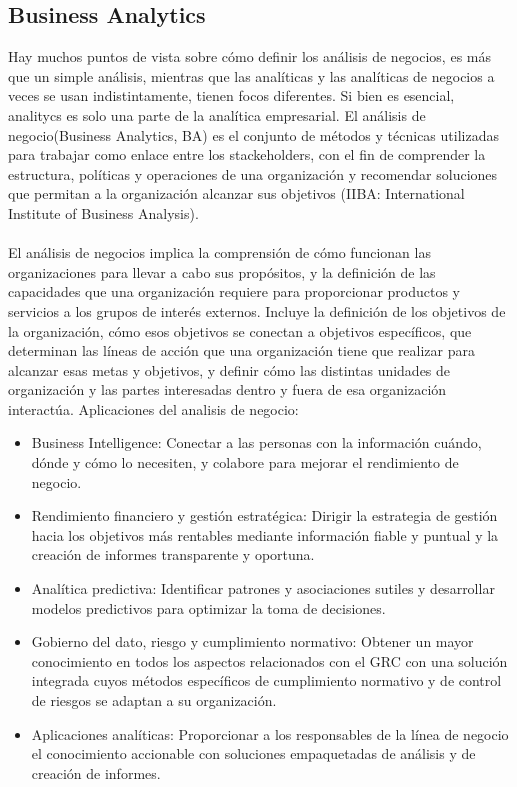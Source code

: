 \documentclass[%
 reprint,
 amsmath,amssymb,
 aps,
]{revtex4-1}
\begin{document}
\subsection{Business Analytics}
Hay muchos puntos de vista sobre cómo definir los análisis de negocios, es más que un simple análisis, mientras que las analíticas y las analíticas de negocios a veces se usan indistintamente, tienen focos diferentes. Si bien es esencial, analitycs es solo una parte de la analítica empresarial.
El análisis de negocio(Business Analytics, BA) es el conjunto de métodos y técnicas utilizadas para trabajar como enlace entre los stackeholders, con el fin de comprender la estructura, políticas y operaciones de una organización y recomendar soluciones que permitan a la organización alcanzar sus objetivos (IIBA: International Institute of Business Analysis).\\\\
El análisis de negocios implica la comprensión de cómo funcionan las organizaciones para llevar a cabo sus propósitos, y la definición de las capacidades que una organización requiere para proporcionar productos y servicios a los grupos de interés externos. Incluye la definición de los objetivos de la organización, cómo esos objetivos se conectan a objetivos específicos, que determinan las líneas de acción que una organización tiene que realizar para alcanzar esas metas y objetivos, y definir cómo las distintas unidades de organización y las partes interesadas dentro y fuera de esa organización interactúa.
Aplicaciones del analisis de negocio:
\begin{itemize}
\item Business Intelligence: Conectar a las personas con la información cuándo, dónde y cómo lo necesiten, y colabore para mejorar el rendimiento de negocio.
\item Rendimiento financiero y gestión estratégica: Dirigir la estrategia de gestión hacia los objetivos más rentables mediante información fiable y puntual y la creación de informes transparente y oportuna.
\item Analítica predictiva: Identificar patrones y asociaciones sutiles y desarrollar modelos predictivos para optimizar la toma de decisiones.
\item Gobierno del dato, riesgo y cumplimiento normativo: Obtener un mayor conocimiento en todos los aspectos relacionados con el GRC con una solución integrada cuyos métodos específicos de cumplimiento normativo y de control de riesgos se adaptan a su organización.
\item Aplicaciones analíticas: Proporcionar a los responsables de la línea de negocio el conocimiento accionable con soluciones empaquetadas de análisis y de creación de informes.


	\end{itemize} 
\end{document}
